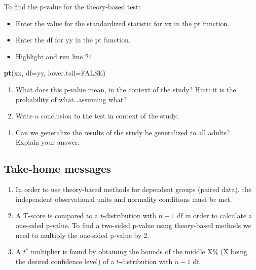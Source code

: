 \documentclass[
]{report}
\newenvironment{Shaded}{\begin{snugshade}}{\end{snugshade}}
\newcommand{\AttributeTok}[1]{\textcolor[rgb]{0.13,0.29,0.53}{#1}}
\newcommand{\ConstantTok}[1]{\textcolor[rgb]{0.56,0.35,0.01}{#1}}
\newcommand{\FunctionTok}[1]{\textcolor[rgb]{0.13,0.29,0.53}{\textbf{#1}}}
\newcommand{\NormalTok}[1]{#1}
\providecommand{\tightlist}{%
  \setlength{\itemsep}{0pt}\setlength{\parskip}{0pt}}
\begin{document}
To find the p-value for the theory-based test:

\begin{itemize}
\item
  Enter the value for the standardized statistic for xx in the pt function.
\item
  Enter the df for yy in the pt function.
\item
  Highlight and run line 24
\end{itemize}

\begin{Shaded}
\begin{Highlighting}[]
\FunctionTok{pt}\NormalTok{(xx, }\AttributeTok{df=}\NormalTok{yy, }\AttributeTok{lower.tail=}\ConstantTok{FALSE}\NormalTok{)}
\end{Highlighting}
\end{Shaded}

\begin{enumerate}
\def\labelenumi{\arabic{enumi}.}
\setcounter{enumi}{11}
\item
  What does this p-value mean, in the context of the study? Hint: it is the probability of what\ldots assuming what?
  \vspace{1in}
\item
  Write a conclusion to the test in context of the study.
\end{enumerate}

\vspace{0.6in}

\begin{enumerate}
\def\labelenumi{\arabic{enumi}.}
\setcounter{enumi}{13}
\tightlist
\item
  Can we generalize the results of the study be generalized to all adults? Explain your answer.
\end{enumerate}

\vspace{0.5in}

\subsection{Take-home messages}\label{take-home-messages-2}

\begin{enumerate}
\def\labelenumi{\arabic{enumi}.}
\item
  In order to use theory-based methods for dependent groups (paired data), the independent observational units and normality conditions must be met.
\item
  A T-score is compared to a \(t\)-distribution with \(n - 1\) df in order to calculate a one-sided p-value. To find a two-sided p-value using theory-based methods we need to multiply the one-sided p-value by 2.
\item
  A \(t^*\) multiplier is found by obtaining the bounds of the middle X\% (X being the desired confidence level) of a \(t\)-distribution with \(n - 1\) df.
\end{enumerate}
\end{document}
